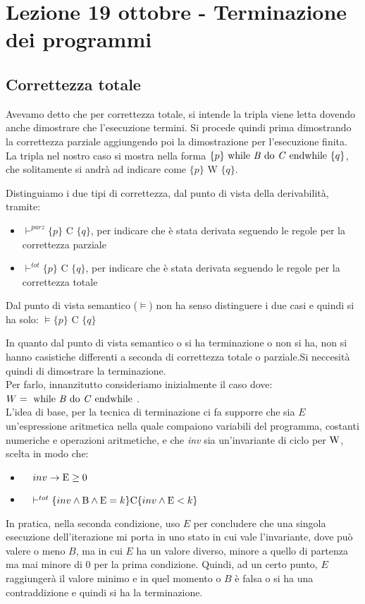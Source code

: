 \section{Lezione 19 ottobre - Terminazione dei programmi}
\subsection{Correttezza totale}
Avevamo detto che per correttezza totale, si intende la tripla viene letta dovendo anche dimostrare che l'esecuzione termini. Si procede quindi prima dimostrando la correttezza parziale aggiungendo poi la dimostrazione per l'esecuzione finita.\\
La tripla nel nostro caso si mostra nella forma $\{p\}\mbox{ while \textit{B} do \textit{C} endwhile }\{q\}$, che solitamente si andrà ad indicare come $\{p\}\mbox{ W }\{q\}$.

Distinguiamo i due tipi di correttezza, dal punto di vista della derivabilità, tramite: 
\begin{itemize}
    \item $\vdash^{parz}\{p\}\mbox{ C }\{q\}$, per indicare che è stata derivata seguendo le regole per la correttezza parziale
    \item $\vdash^{tot}\{p\}\mbox{ C }\{q\}$, per indicare che è stata derivata seguendo le regole per la  correttezza totale
\end{itemize}
Dal punto di vista semantico ($\vDash$) non ha senso distinguere i due casi e quindi si ha solo: $\vDash\{p\}\mbox{ C }\{q\}$

In quanto dal punto di vista semantico o si ha terminazione o non si ha, non si hanno casistiche differenti a seconda di correttezza totale o parziale.Si neccesità quindi di dimostrare la terminazione.\\ 
Per farlo, innanzitutto consideriamo inizialmente il caso dove: $W=\mbox{ while \textit{B} do \textit{C} endwhile }$. \\
L'idea di base, per la tecnica di terminazione ci fa supporre che sia $E$ un'espressione aritmetica nella quale compaiono variabili del programma, costanti numeriche e operazioni aritmetiche, e che \textit{inv} sia un’invariante di ciclo per $\textnormal{W}$, scelta in modo che: 
\begin{itemize}
    \item $\quad inv \to \textnormal{E} \geq 0$ 
    \item $\quad \vdash^{tot} \{inv  \land \textnormal{B}  \land  \textnormal{E} = k \}  \textnormal{C}  \{inv  \land  \textnormal{E} < k\} $
\end{itemize} 
In pratica, nella seconda condizione, uso $E$ per concludere che una singola esecuzione dell'iterazione mi porta in uno stato in cui vale l'invariante, dove può valere o meno $B$, ma in cui $E$ ha un valore diverso, minore a quello di partenza ma mai minore di 0 per la prima condizione. Quindi, ad un certo punto, $E$ raggiungerà il valore minimo e in quel momento o $B$ è falsa o si ha una contraddizione e quindi si ha la terminazione.\\

